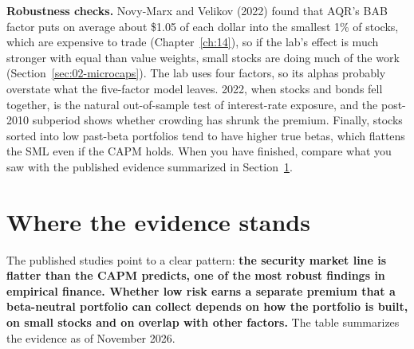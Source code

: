 \label{sec:18-stress}
\textbf{Robustness checks.} Novy-Marx and Velikov (2022) found that AQR's BAB factor puts on average about \$1.05 of each dollar into the smallest 1\% of stocks, which are expensive to trade (Chapter~\ref{ch:14}), so if the lab's effect is much stronger with equal than value weights, small stocks are doing much of the work (Section~\ref{sec:02-microcaps}). The lab uses four factors, so its alphas probably overstate what the five-factor model leaves. 2022, when stocks and bonds fell together, is the natural out-of-sample test of interest-rate exposure, and the post-2010 subperiod shows whether crowding has shrunk the premium. Finally, stocks sorted into low past-beta portfolios tend to have higher true betas, which flattens the SML even if the CAPM holds. When you have finished, compare what you saw with the published evidence summarized in Section~\ref{sec:18-verdict}.

\section{Where the evidence stands}
\label{sec:18-verdict}

The published studies point to a clear pattern: \textbf{the security market line is flatter than the CAPM predicts, one of the most robust findings in empirical finance. Whether low risk earns a separate premium that a beta-neutral portfolio can collect depends on how the portfolio is built, on small stocks and on overlap with other factors.} The table summarizes the evidence as of November 2026.


